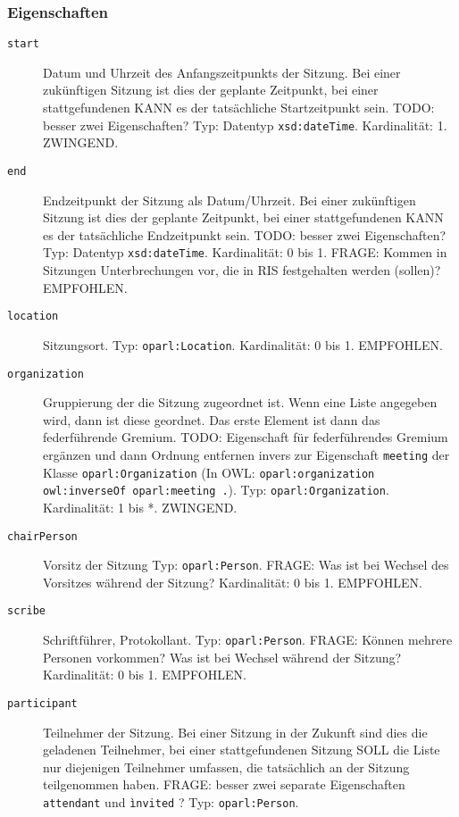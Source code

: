 \documentclass[,a4paper]{article}
\begin{document}
\subsubsection{Eigenschaften}\label{eigenschaften-4}

\begin{description}
\item[\texttt{start}]
Datum und Uhrzeit des Anfangszeitpunkts der Sitzung. Bei einer
zukünftigen Sitzung ist dies der geplante Zeitpunkt, bei einer
stattgefundenen KANN es der tatsächliche Startzeitpunkt sein. TODO:
besser zwei Eigenschaften? Typ: Datentyp \texttt{xsd:dateTime}.
Kardinalität: 1. ZWINGEND.
\item[\texttt{end}]
Endzeitpunkt der Sitzung als Datum/Uhrzeit. Bei einer zukünftigen
Sitzung ist dies der geplante Zeitpunkt, bei einer stattgefundenen KANN
es der tatsächliche Endzeitpunkt sein. TODO: besser zwei Eigenschaften?
Typ: Datentyp \texttt{xsd:dateTime}. Kardinalität: 0 bis 1. FRAGE:
Kommen in Sitzungen Unterbrechungen vor, die in RIS festgehalten werden
(sollen)? EMPFOHLEN.
\item[\texttt{location}]
Sitzungsort. Typ: \texttt{oparl:Location}. Kardinalität: 0 bis 1.
EMPFOHLEN.
\item[\texttt{organization}]
Gruppierung der die Sitzung zugeordnet ist. Wenn eine Liste angegeben
wird, dann ist diese geordnet. Das erste Element ist dann das
federführende Gremium. TODO: Eigenschaft für federführendes Gremium
ergänzen und dann Ordnung entfernen invers zur Eigenschaft
\texttt{meeting} der Klasse \texttt{oparl:Organization} (In OWL:
\texttt{oparl:organization owl:inverseOf oparl:meeting .}). Typ:
\texttt{oparl:Organization}. Kardinalität: 1 bis *. ZWINGEND.
\item[\texttt{chairPerson}]
Vorsitz der Sitzung Typ: \texttt{oparl:Person}. FRAGE: Was ist bei
Wechsel des Vorsitzes während der Sitzung? Kardinalität: 0 bis 1.
EMPFOHLEN.
\item[\texttt{scribe}]
Schriftführer, Protokollant. Typ: \texttt{oparl:Person}. FRAGE: Können
mehrere Personen vorkommen? Was ist bei Wechsel während der Sitzung?
Kardinalität: 0 bis 1. EMPFOHLEN.
\item[\texttt{participant}]
Teilnehmer der Sitzung. Bei einer Sitzung in der Zukunft sind dies die
geladenen Teilnehmer, bei einer stattgefundenen Sitzung SOLL die Liste
nur diejenigen Teilnehmer umfassen, die tatsächlich an der Sitzung
teilgenommen haben. FRAGE: besser zwei separate Eigenschaften
\texttt{attendant} und \texttt{ìnvited} ? Typ: \texttt{oparl:Person}.

\end{description}
\end{document}
